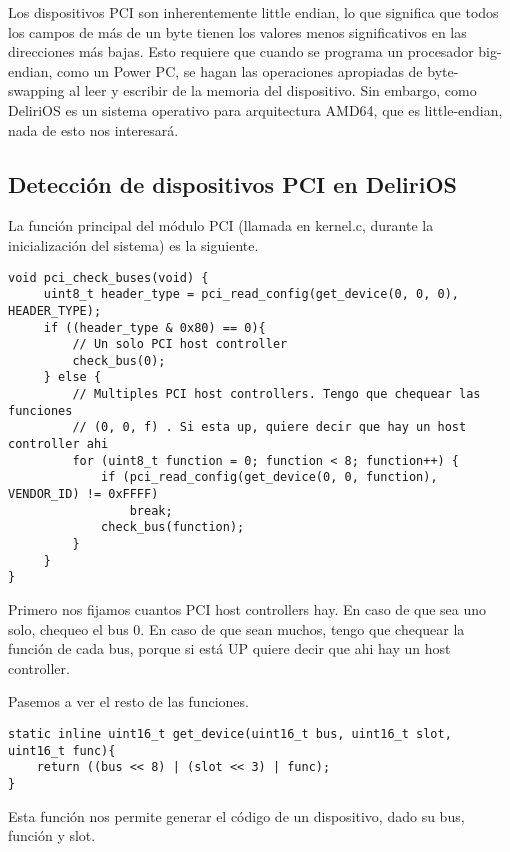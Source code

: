 Los dispositivos PCI son inherentemente little endian, lo que significa que todos los campos de más de un byte tienen los valores menos significativos en las direcciones más bajas. Esto requiere que cuando se programa un procesador big-endian, como un Power PC, se hagan las operaciones apropiadas de byte-swapping al leer y escribir de la memoria del dispositivo. Sin embargo, como DeliriOS es un sistema operativo para arquitectura AMD64, que es little-endian, nada de esto nos interesará.


\subsection{Detección de dispositivos PCI en DeliriOS}

La función principal del módulo PCI (llamada en kernel.c, durante la inicialización del sistema) es la siguiente.

\begin{lstlisting}[style=customcmucho]
void pci_check_buses(void) {
     uint8_t header_type = pci_read_config(get_device(0, 0, 0), HEADER_TYPE);
     if ((header_type & 0x80) == 0){
         // Un solo PCI host controller
         check_bus(0);
     } else {
         // Multiples PCI host controllers. Tengo que chequear las funciones
         // (0, 0, f) . Si esta up, quiere decir que hay un host controller ahi
         for (uint8_t function = 0; function < 8; function++) {
             if (pci_read_config(get_device(0, 0, function), VENDOR_ID) != 0xFFFF)
                 break;
             check_bus(function);
         }
     }
}
\end{lstlisting}

Primero nos fijamos cuantos PCI host controllers hay. En caso de que sea uno solo, chequeo el bus 0. En caso de que sean muchos, tengo que chequear la función de cada bus, porque si está UP quiere decir que ahi hay un host controller.


Pasemos a ver el resto de las funciones. 

\begin{lstlisting}[style=customcmucho]
static inline uint16_t get_device(uint16_t bus, uint16_t slot, uint16_t func){
    return ((bus << 8) | (slot << 3) | func);
}
\end{lstlisting}

Esta función nos permite generar el código de un dispositivo, dado su bus, función y slot.


